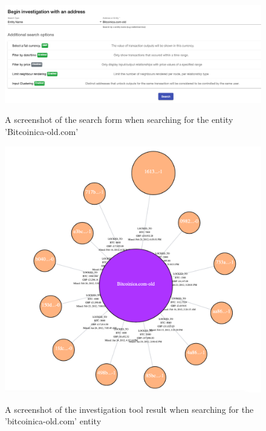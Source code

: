 \begin{figure}[h!]
  \centering
  \includegraphics[width = 15cm]{./figures/ui-screenshots/bitcoinica-search-form}\\[0.5cm]
  \caption{A screenshot of the search form when searching for the entity 'Bitcoinica-old.com'}
  \label{fig:bitcoinica-search-form}
\end{figure}

\begin{figure}[h!]
  \centering
  \includegraphics[width = 15cm]{./figures/bitcoinica-enity-search}\\[0.5cm]
  \caption{A screenshot of the investigation tool result when searching for the 'bitcoinica-old.com' entity}
  \label{fig:bitcoinica-old-result}
\end{figure}

